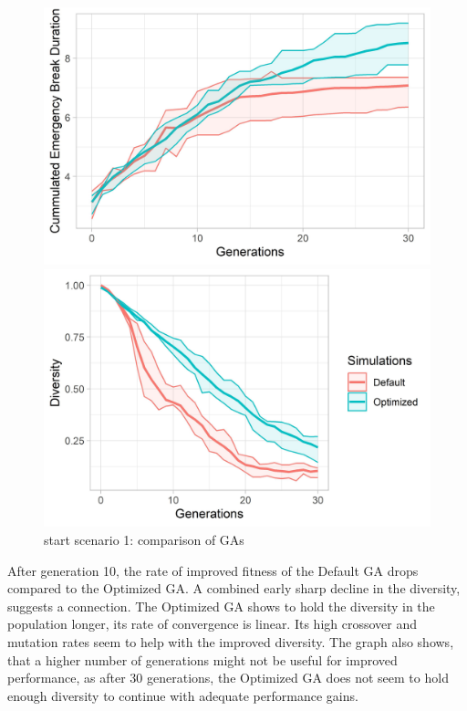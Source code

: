 \begin{figure}[ht] 
	\begin{minipage}[b]{0.5\linewidth}
		\centering
		\includegraphics[width=1\linewidth]{simulations/evaluation/plots/sim_1_ga_generations} 
	\end{minipage}%
	\begin{minipage}[b]{0.5\linewidth}
		\centering
		\includegraphics[width=1\linewidth]{simulations/evaluation/plots/sim_1_ga_diversity} 
	\end{minipage} 
	\caption{start scenario 1: comparison of GAs}
	\label{fig:evaluation:sim_1_ga_comparison}
\end{figure}

After generation 10, the rate of improved fitness of the Default GA drops compared to the Optimized GA. A combined early sharp decline in the diversity, suggests a connection. The Optimized GA shows to hold the diversity in the population longer, its rate of convergence is linear. Its high crossover and mutation rates seem to help with the improved diversity. The graph also shows, that a higher number of generations might not be useful for improved performance, as after 30 generations, the Optimized GA does not seem to hold enough diversity to continue with adequate performance gains. 

